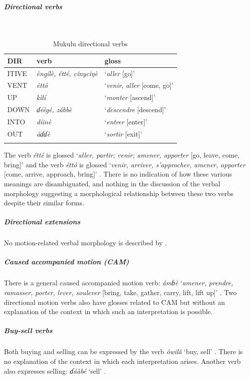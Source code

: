 \subparagraph{Directional verbs}~

\begin{table}[H]
	\caption{Mukulu directional verbs} 
	\label{tab:mukuV}
	\begin{tabular}{lll} %
		\lsptoprule
		DIR & verb & gloss   \\ %
		\midrule
		ITIVE & \textit{èngílè, étté, cînycîŋè} & `\textit{aller} [go]' \\
		VENT & \textit{éttó} & `\textit{venir}, \textit{aller} [come, go]' \\
		UP & \textit{kìlí} & `\textit{monter} [ascend]' \\
		DOWN & \textit{ɗéègé, zábbè} & `\textit{descendre} [descend]' \\
		INTO& \textit{díinè} & `\textit{entrer} [enter]' \\
		OUT & \textit{áɗɗè}  & `\textit{sortir} [exit]' \\
		\lspbottomrule
	\end{tabular}
\end{table}

The verb \textit{étté} is glossed `\textit{aller, partir; venir; amener, apporter} [go, leave, come, bring]' and the verb \textit{éttó} is glossed `\textit{venir, arriver, s’approcher, amener, apporter} [come, arrive, approach, bring]' \citep[96]{jungraithmayrLexiqueMokilko1990}. There is no indication of how these various meanings are disambiguated, and nothing in the discussion of the verbal morphology suggesting a morphological relationship between these two verbs despite their similar forms.

\subparagraph{Directional extensions}

No motion-related verbal morphology is described by \citet{jungraithmayrLexiqueMokilko1990}. 

\subparagraph{Caused accompanied motion (CAM)}

There is a general caused accompanied motion verb: \textit{ámɓè} `\textit{amener, prendre, ramasser, porter, lever, soulever} [bring, take, gather, carry, lift, lift up]' \citep[58]{jungraithmayrLexiqueMokilko1990}. Two directional motion verbs also have glosses related to CAM but without an explanation of the context in which such an interpretation is possible.  

\subparagraph{Buy-sell verbs}

Both buying and selling can be expressed by the verb \textit{ôwilâ} `buy, sell' \citep[159]{jungraithmayrLexiqueMokilko1990}. There is no explanation of the context in which each interpretation arises. Another verb also expresses selling: \textit{ɗáàbé} `sell' \citep[87]{jungraithmayrLexiqueMokilko1990}.

